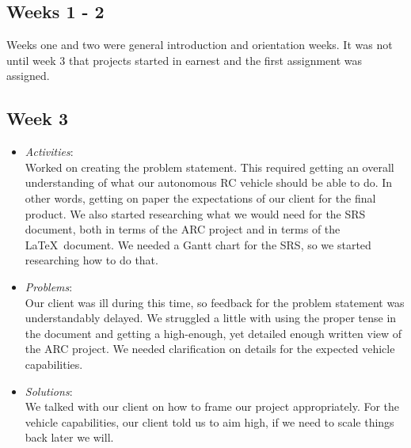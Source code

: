 \documentclass[compsoc,draftclsnofoot,onecolumn,10pt]{IEEEtran}
\begin{document}
\subsection{Weeks 1 - 2}
Weeks one and two were general introduction and orientation weeks. It was
not until week 3 that projects started in earnest and the first assignment was
assigned.

\subsection{Week 3}
	\begin{itemize}
        \item \textit{Activities}:\\
            Worked on creating the problem statement. This required getting an
            overall understanding of what our autonomous RC vehicle should be able
            to do. In other words, getting on paper the expectations of our client
            for the final product. We also started researching what we would need
            for the SRS document, both in terms of the ARC project and in terms of
            the \LaTeX~document. We needed a Gantt chart for the SRS, so we started
            researching how to do that.

        \item \textit{Problems}:\\
            Our client was ill during this time, so feedback for the problem
            statement was understandably delayed. We struggled a little with using
            the proper tense in the document and getting a high-enough, yet detailed
            enough written view of the ARC project. We needed clarification on
            details for the expected vehicle capabilities.

        \item \textit{Solutions}:\\
            We talked with our client on how to frame our project appropriately.
            For the vehicle capabilities, our client told us to aim high, if we
            need to scale things back later we will.

	\end{itemize}
 
\end{document}
